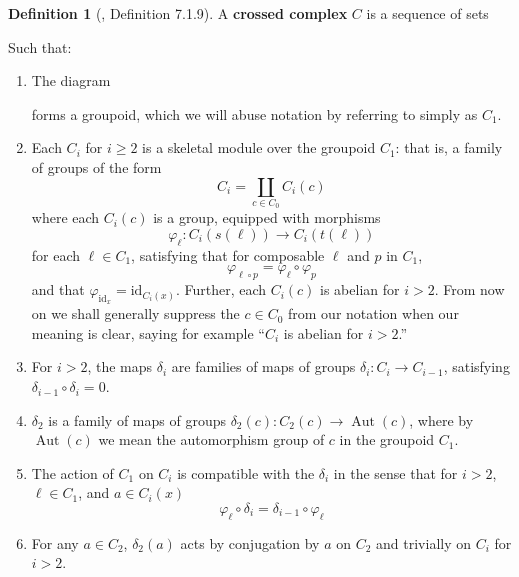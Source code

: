 \documentclass[12pt]{article}
\theoremstyle{definition}
\newtheorem{definition}[theorem]{Definition}
\renewcommand{\phi}{\varphi}
\newcommand{\id}{\text{id}}
\DeclareMathOperator{\Aut}{Aut}
\begin{document}
	\begin{definition}[\cite{Brown_Higgins_Sivera_2011}, Definition 7.1.9]
	A \textbf{crossed complex} $C$ is a sequence of sets 
	\begin{center}
	\end{center}
	Such that:
	\begin{enumerate}
		\item The diagram
	\begin{center}
	\end{center}
	forms a groupoid, which we will abuse notation by referring to simply as $C_1$.
	\item Each $C_i$ for $i \ge 2$ is a skeletal module over the groupoid $C_1$: that is, a family of groups of the form 
	$$C_i = \coprod_{c \in C_0} C_i(c)$$
	where each $C_i(c)$ is a group, equipped with morphisms
	$$
	\phi_\ell: C_i(s(\ell)) \to C_i(t(\ell))
	$$
	for each $\ell \in C_1$, satisfying that for composable $\ell$ and $p$ in $C_1$, 
	$$
	\phi_{\ell \circ p} = \phi_\ell \circ \phi_p
	$$
	and that $\phi_{\id_x} = \id_{C_i(x)}$. Further, each $C_i(c)$ is abelian for $i>2$. From now on we shall generally suppress the $ c \in C_0$ from our notation when our meaning is clear, saying for example ``$C_i$ is abelian for $i > 2$.''
	\item For $i > 2$, the maps $\delta_i$ are families of maps of groups $\delta_i : C_i \to C_{i-1}$, satisfying $\delta_{i-1} \circ \delta_i = 0$.
	\item $\delta_2$ is a family of maps of groups $\delta_2(c) : C_2(c) \to \Aut(c)$, where by $\Aut(c)$ we mean the automorphism group of $c$ in the groupoid $C_1$.
	\item The action of $C_1$ on $C_i$ is compatible with the $\delta_i$ in the sense that for $i > 2$, $\ell \in C_1$, and $a \in C_i(x)$
	$$\phi_\ell \circ \delta_i = \delta_{i-1} \circ \phi_\ell$$
	\item For any $a \in C_2$, $\delta_2(a)$ acts by conjugation by $a$ on $C_2$ and trivially on $C_i$ for $i > 2$.
	\end{enumerate}
	\end{definition}
	
\end{document}
